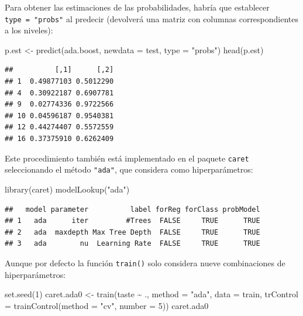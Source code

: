 \documentclass[
]{book}
\newenvironment{Shaded}{\begin{snugshade}}{\end{snugshade}}
\newcommand{\AttributeTok}[1]{\textcolor[rgb]{0.77,0.63,0.00}{#1}}
\newcommand{\DecValTok}[1]{\textcolor[rgb]{0.00,0.00,0.81}{#1}}
\newcommand{\FunctionTok}[1]{\textcolor[rgb]{0.00,0.00,0.00}{#1}}
\newcommand{\NormalTok}[1]{#1}
\newcommand{\OtherTok}[1]{\textcolor[rgb]{0.56,0.35,0.01}{#1}}
\newcommand{\SpecialCharTok}[1]{\textcolor[rgb]{0.00,0.00,0.00}{#1}}
\newcommand{\StringTok}[1]{\textcolor[rgb]{0.31,0.60,0.02}{#1}}
\theoremstyle{break}
\theoremstyle{definition}
\theoremstyle{definition}
\theoremstyle{definition}
\theoremstyle{definition}
\theoremstyle{remark}
\begin{document}
Para obtener las estimaciones de las probabilidades, habría que establecer \texttt{type\ =\ "probs"} al predecir (devolverá una matriz con columnas correspondientes a los niveles):

\begin{Shaded}
\begin{Highlighting}[]
\NormalTok{p.est }\OtherTok{\textless{}{-}} \FunctionTok{predict}\NormalTok{(ada.boost, }\AttributeTok{newdata =}\NormalTok{ test, }\AttributeTok{type =} \StringTok{"probs"}\NormalTok{)}
\FunctionTok{head}\NormalTok{(p.est)}
\end{Highlighting}
\end{Shaded}

\begin{verbatim}
##          [,1]      [,2]
## 1  0.49877103 0.5012290
## 4  0.30922187 0.6907781
## 9  0.02774336 0.9722566
## 10 0.04596187 0.9540381
## 12 0.44274407 0.5572559
## 16 0.37375910 0.6262409
\end{verbatim}

Este procedimiento también está implementado en el paquete \texttt{caret} seleccionando el método \texttt{"ada"}, que considera como hiperparámetros:

\begin{Shaded}
\begin{Highlighting}[]
\FunctionTok{library}\NormalTok{(caret)}
\FunctionTok{modelLookup}\NormalTok{(}\StringTok{"ada"}\NormalTok{)}
\end{Highlighting}
\end{Shaded}

\begin{verbatim}
##   model parameter          label forReg forClass probModel
## 1   ada      iter         #Trees  FALSE     TRUE      TRUE
## 2   ada  maxdepth Max Tree Depth  FALSE     TRUE      TRUE
## 3   ada        nu  Learning Rate  FALSE     TRUE      TRUE
\end{verbatim}

Aunque por defecto la función \texttt{train()} solo considera nueve combinaciones de hiperparámetros:

\begin{Shaded}
\begin{Highlighting}[]
\FunctionTok{set.seed}\NormalTok{(}\DecValTok{1}\NormalTok{)}
\NormalTok{caret.ada0 }\OtherTok{\textless{}{-}} \FunctionTok{train}\NormalTok{(taste }\SpecialCharTok{\textasciitilde{}}\NormalTok{ ., }\AttributeTok{method =} \StringTok{"ada"}\NormalTok{, }\AttributeTok{data =}\NormalTok{ train,}
                   \AttributeTok{trControl =} \FunctionTok{trainControl}\NormalTok{(}\AttributeTok{method =} \StringTok{"cv"}\NormalTok{, }\AttributeTok{number =} \DecValTok{5}\NormalTok{))}
\NormalTok{caret.ada0}
\end{Highlighting}
\end{Shaded}
\end{document}
